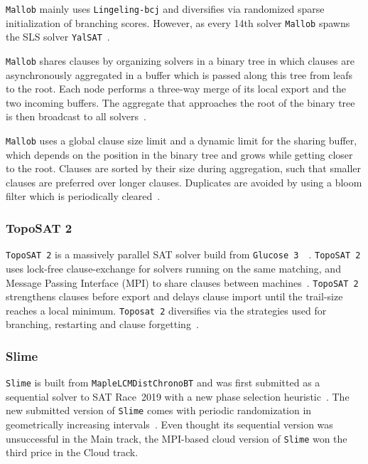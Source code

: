 \documentclass{elsarticle}
\newcommand{\solver}[1]{\texttt{#1}}
\begin{document}
\solver{Mallob} mainly uses \solver{Lingeling-bcj} and diversifies via randomized sparse initialization of branching scores. 
However, as every 14th solver \solver{Mallob} spawns the SLS solver \solver{YalSAT}~\cite{Biere:2018:LingelingYalsat}. 

\solver{Mallob} shares clauses by organizing solvers in a binary tree in which clauses are asynchronously aggregated in a buffer which is passed along this tree from leafs to the root. 
Each node performs a three-way merge of its local export and the two incoming buffers. 
The aggregate that approaches the root of the binary tree is then broadcast to all solvers~\cite{Schreiber:SC2020}. 

\solver{Mallob} uses a global clause size limit and a dynamic limit for the sharing buffer, which depends on the position in the binary tree and grows while getting closer to the root. 
Clauses are sorted by their size during aggregation, such that smaller clauses are preferred over longer clauses. 
Duplicates are avoided by using a bloom filter which is periodically cleared~\cite{Schreiber:SC2020}. 


\subsubsection{TopoSAT 2}

\solver{TopoSAT~2} is a massively parallel SAT solver build from \solver{Glucose~3}~\cite{Audemard:2018:Glucose}~\cite{Ehlers:2018:Toposat2}. 
\solver{TopoSAT~2} uses lock-free clause-exchange for solvers running on the same matching, and Message Passing Interface (MPI) to share clauses between machines~\cite{Hamadi:2009:ManySat}. 
\solver{TopoSAT~2} strengthens clauses before export and delays clause import until the trail-size reaches a local minimum. 
\solver{Toposat~2} diversifies via the strategies used for branching, restarting and clause forgetting~\cite{Ehlers:SC2020}. 


\subsubsection{Slime}

\solver{Slime} is built from \solver{MapleLCMDistChronoBT} and was first submitted as a sequential solver to SAT Race~2019 with a new phase selection heuristic~\cite{Riveros:SC2019}. 
The new submitted version of \solver{Slime} comes with periodic randomization in geometrically increasing intervals~\cite{Riveros:SC2020}. 
Even thought its sequential version was unsuccessful in the Main track, the MPI-based cloud version of \solver{Slime} won the third price in the Cloud track. 
\end{document}
